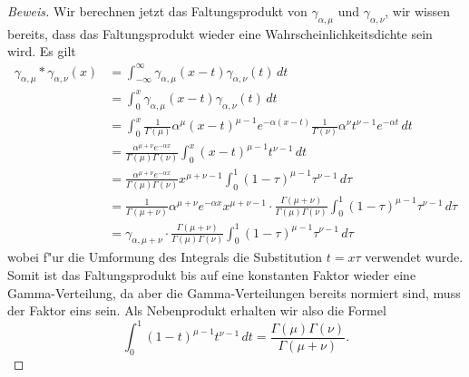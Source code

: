 {\begin{proof}[Beweis]
Wir berechnen jetzt das Faltungsprodukt von $\gamma_{\alpha,\mu}$ und
$\gamma_{\alpha,\nu}$, wir wissen bereits, dass das Faltungsprodukt wieder
eine Wahrscheinlichkeitsdichte sein wird.
Es gilt
\begin{align*}
\gamma_{\alpha,\mu}*\gamma_{\alpha,\nu}(x)
&=\int_{-\infty}^\infty \gamma_{\alpha,\mu}(x-t)\gamma_{\alpha,\nu}(t)\,dt\\
&=\int_0^x \gamma_{\alpha,\mu}(x-t)\gamma_{\alpha,\nu}(t)\,dt\\
&=\int_0^x \frac1{\Gamma(\mu)}\alpha^{\mu}(x-t)^{\mu-1}e^{-\alpha (x-t)}
\frac1{\Gamma(\nu)}\alpha^\nu t^{\nu-1}e^{-\alpha t}\,dt\\
&=\frac{\alpha^{\mu+\nu}e^{-\alpha x}}{\Gamma(\mu)\Gamma(\nu)}\int_0^x
(x-t)^{\mu-1}t^{\nu-1}\,dt\\
&=\frac{\alpha^{\mu+\nu}e^{-\alpha x}}{\Gamma(\mu)\Gamma(\nu)}x^{\mu+\nu-1}
\int_0^1 (1-\tau)^{\mu-1}\tau^{\nu-1}\,d\tau\\
&=
\frac1{\Gamma(\mu+\nu)}\alpha^{\mu+\nu}e^{-\alpha x}
x^{\mu+\nu-1}
\cdot
\frac{\Gamma(\mu+\nu)}{\Gamma(\mu)\Gamma(\nu)}
\int_0^1 (1-\tau)^{\mu-1}\tau^{\nu-1}\,d\tau\\
&=\gamma_{\alpha,\mu+\nu}
\cdot
\frac{\Gamma(\mu+\nu)}{\Gamma(\mu)\Gamma(\nu)}
\int_0^1 (1-\tau)^{\mu-1}\tau^{\nu-1}\,d\tau
\end{align*}
wobei f"ur die Umformung des Integrals die Substitution $t=x\tau$ verwendet
wurde.
Somit ist das Faltungsprodukt bis auf eine konstanten Faktor
wieder eine Gamma-Verteilung, da aber die Gamma-Verteilungen bereits
normiert sind, muss der Faktor eins sein. Als Nebenprodukt erhalten
wir also die Formel
\[
\int_0^1(1-t)^{\mu-1}t^{\nu-1}\,dt=\frac{\Gamma(\mu)\Gamma(\nu)}{\Gamma(\mu+\nu)}.
\]
\end{proof}

}
